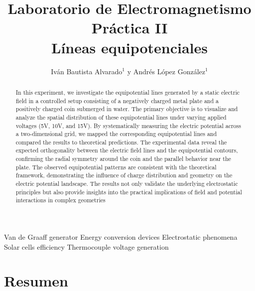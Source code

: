 \documentclass[article,12pt]{elsarticle}
\begin{document}
\begin{frontmatter}
    \title{Laboratorio de Electromagnetismo \\
    Práctica II\\ 
    Líneas equipotenciales}

    \author{Iván Bautista Alvarado$^1$ y Andrés López González$^1$} %
    \address{$^1$ Facultad de Ciencias, Universidad Nacional Autónoma de México, M\'exico CDMX.}

    \begin{abstract}

In this experiment, we investigate the equipotential lines generated by a static electric field in a controlled setup consisting of a negatively charged metal plate and a positively charged coin submerged in water. The primary objective is to visualize and analyze the spatial distribution of these equipotential lines under varying applied voltages (5V, 10V, and 15V). By systematically measuring the electric potential across a two-dimensional grid, we mapped the corresponding equipotential lines and compared the results to theoretical predictions. The experimental data reveal the expected orthogonality between the electric field lines and the equipotential contours, confirming the radial symmetry around the coin and the parallel behavior near the plate. The observed equipotential patterns are consistent with the theoretical framework, demonstrating the influence of charge distribution and geometry on the electric potential landscape. The results not only validate the underlying electrostatic principles but also provide insights into the practical implications of field and potential interactions in complex geometries

    \end{abstract}


    \begin{keyword}
Van de Graaff generator
Energy conversion devices
Electrostatic phenomena
Solar cells efficiency
Thermocouple voltage generation
    \end{keyword}

\end{frontmatter}

    \section*{Resumen}
\end{document}
